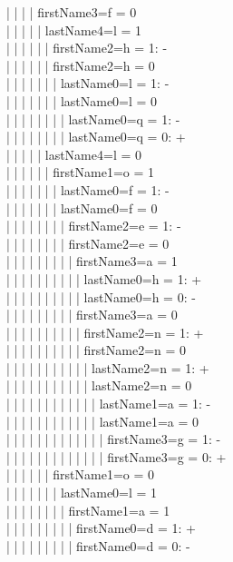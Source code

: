 \begin{enumerate}
|  |  |  |  firstName3=f = 0\\
|  |  |  |  |  lastName4=l = 1\\
|  |  |  |  |  |  firstName2=h = 1: -\\
|  |  |  |  |  |  firstName2=h = 0\\
|  |  |  |  |  |  |  lastName0=l = 1: -\\
|  |  |  |  |  |  |  lastName0=l = 0\\
|  |  |  |  |  |  |  |  lastName0=q = 1: -\\
|  |  |  |  |  |  |  |  lastName0=q = 0: +\\
|  |  |  |  |  lastName4=l = 0\\
|  |  |  |  |  |  firstName1=o = 1\\
|  |  |  |  |  |  |  lastName0=f = 1: -\\
|  |  |  |  |  |  |  lastName0=f = 0\\
|  |  |  |  |  |  |  |  firstName2=e = 1: -\\
|  |  |  |  |  |  |  |  firstName2=e = 0\\
|  |  |  |  |  |  |  |  |  firstName3=a = 1\\
|  |  |  |  |  |  |  |  |  |  lastName0=h = 1: +\\
|  |  |  |  |  |  |  |  |  |  lastName0=h = 0: -\\
|  |  |  |  |  |  |  |  |  firstName3=a = 0\\
|  |  |  |  |  |  |  |  |  |  firstName2=n = 1: +\\
|  |  |  |  |  |  |  |  |  |  firstName2=n = 0\\
|  |  |  |  |  |  |  |  |  |  |  lastName2=n = 1: +\\
|  |  |  |  |  |  |  |  |  |  |  lastName2=n = 0\\
|  |  |  |  |  |  |  |  |  |  |  |  lastName1=a = 1: -\\
|  |  |  |  |  |  |  |  |  |  |  |  lastName1=a = 0\\
|  |  |  |  |  |  |  |  |  |  |  |  |  firstName3=g = 1: -\\
|  |  |  |  |  |  |  |  |  |  |  |  |  firstName3=g = 0: +\\
|  |  |  |  |  |  firstName1=o = 0\\
|  |  |  |  |  |  |  lastName0=l = 1\\
|  |  |  |  |  |  |  |  firstName1=a = 1\\
|  |  |  |  |  |  |  |  |  firstName0=d = 1: +\\
|  |  |  |  |  |  |  |  |  firstName0=d = 0: -\\

\end{enumerate}
